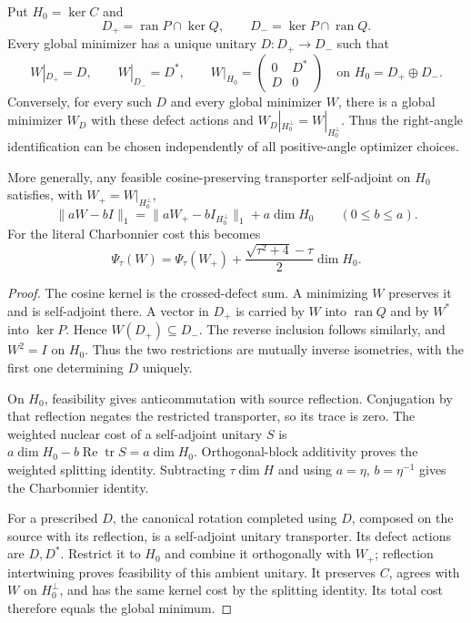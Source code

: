 \begin{proposition}
\label{prop:smoothed-arbitrary-defects}
Put $H_0=\ker C$ and
\[
 D_+=\operatorname{ran}P\cap\ker Q,\qquad
 D_-=\ker P\cap\operatorname{ran}Q.
\]
Every global minimizer has a unique unitary $D:D_+\to D_-$ such that
\[
 W|_{D_+}=D,\qquad W|_{D_-}=D^*,
 \qquad
 W|_{H_0}=\begin{pmatrix}0&D^*\\D&0\end{pmatrix}
 \quad\text{on }H_0=D_+\oplus D_-.
\]
Conversely, for every such $D$ and every global minimizer $W$, there
is a global minimizer $W_D$ with these defect actions and
$W_D|_{H_0^\perp}=W|_{H_0^\perp}$.
Thus the right-angle identification can be chosen independently of all
positive-angle optimizer choices.

More generally, any feasible cosine-preserving transporter self-adjoint
on $H_0$ satisfies, with $W_+=W|_{H_0^\perp}$,
\[
 \|aW-bI\|_1=\|aW_+-bI_{H_0^\perp}\|_1+a\dim H_0
 \qquad(0\leq b\leq a).
\]
For the literal Charbonnier cost this becomes
\[
 \Psi_\tau(W)=\Psi_\tau(W_+)
   +\frac{\sqrt{\tau^2+4}-\tau}{2}\dim H_0.
\]
\end{proposition}

\begin{proof}
The cosine kernel is the crossed-defect sum. A minimizing $W$ preserves
it and is self-adjoint there. A vector in $D_+$ is carried by $W$ into
$\operatorname{ran}Q$ and by $W^*$ into $\ker P$. Hence $W(D_+)\subseteq
D_-$. The reverse inclusion follows similarly, and $W^2=I$ on $H_0$.
Thus the two restrictions are mutually inverse isometries, with the first
one determining $D$ uniquely.

On $H_0$, feasibility gives anticommutation with source reflection.
Conjugation by that reflection negates the restricted transporter, so
its trace is zero. The weighted nuclear cost of a self-adjoint unitary
$S$ is $a\dim H_0-b\operatorname{Re}\operatorname{tr}S=a\dim H_0$.
Orthogonal-block additivity proves the weighted splitting identity.
Subtracting $\tau\dim H$ and using $a=\eta$, $b=\eta^{-1}$ gives
the Charbonnier identity.

For a prescribed $D$, the canonical rotation completed using $D$,
composed on the source with its reflection, is a self-adjoint unitary
transporter. Its defect actions are $D,D^*$. Restrict it to $H_0$ and
combine it orthogonally with $W_+$; reflection intertwining proves
feasibility of this ambient unitary. It preserves $C$, agrees with $W$
on $H_0^\perp$, and has the same kernel cost by the splitting identity.
Its total cost therefore equals the global minimum.
\end{proof}

